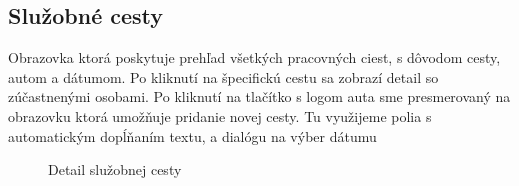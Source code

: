 \subsection{Služobné cesty}
Obrazovka ktorá poskytuje prehľad všetkých pracovných ciest, s dôvodom cesty, autom a dátumom. Po kliknutí na špecifickú cestu sa zobrazí detail so zúčastnenými osobami. Po kliknutí na tlačítko s logom auta sme presmerovaný na obrazovku ktorá umožňuje pridanie novej cesty. Tu využijeme polia s automatickým dopĺňaním textu, a dialógu na výber dátumu
\vspace{10pt}
\begin{figure}[H]
  \centering
  \hfill
    \caption{Detail služobnej cesty}
\end{figure}


